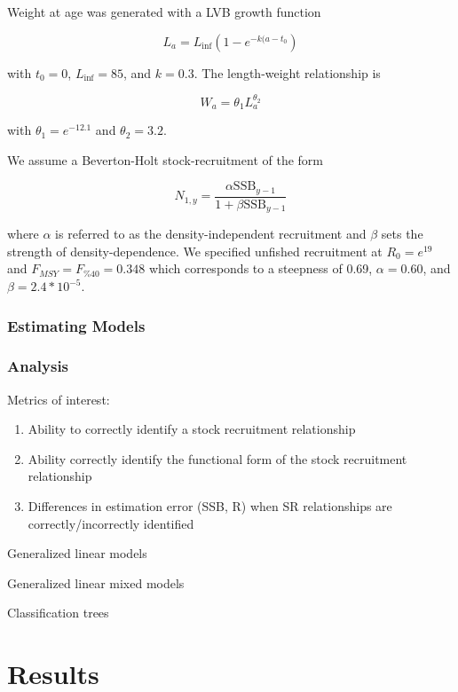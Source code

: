 \documentclass[11pt]{article}
\begin{document}
Weight at age was generated with a LVB growth function

$$ L_a = L_{\inf} \left( 1 - e^{-k(a-t_0}  \right)$$

with $t_0 = 0$, $L_{\inf}=85$, and $k=0.3$. The length-weight relationship is

$$W_a = \theta_1 L_a^{\theta_2}$$

with $\theta_1 = e^{-12.1}$ and $\theta_2 = 3.2$.

We assume a Beverton-Holt stock-recruitment of the form 

$$ N_{1,y} = \frac{\alpha\mathrm{SSB}_{y-1}}{1 + \beta \mathrm{SSB}_{y-1}} $$

where $\alpha$ is referred to as the density-independent recruitment and $\beta$ sets the strength of density-dependence. 
We specified unfished recruitment at $R_0 = e^{19}$ and $F_{MSY} = F_{\%40} = 0.348$ which corresponds to a steepness of 0.69, $\alpha=0.60$, and $\beta=2.4*10^{-5}$.

\subsubsection*{Estimating Models}


\subsubsection*{Analysis}

Metrics of interest: 
\begin{enumerate}
    \item Ability to correctly identify a stock recruitment relationship
    \item Ability correctly identify the functional form of the stock recruitment relationship
    \item Differences in estimation error (SSB, R) when SR relationships are correctly/incorrectly identified
\end{enumerate}

Generalized linear models

Generalized linear mixed models

Classification trees



\section*{Results}
\end{document}
